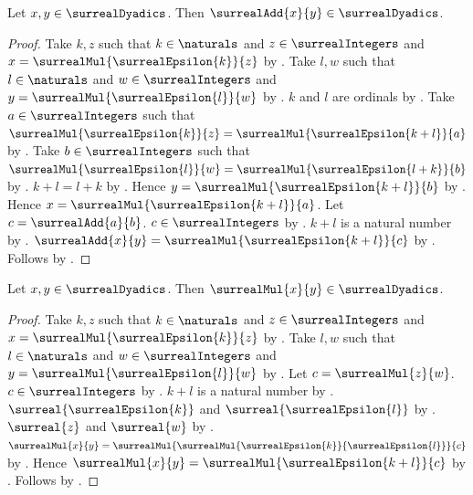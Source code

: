 \begin{theorem}\label{surreal_dyadic_addition_closed}
    Let $x,y\in\surrealDyadics$.
    Then $\surrealAdd{x}{y}\in\surrealDyadics$.
\end{theorem}
\begin{proof}
    Take $k,z$ such that $k\in\naturals$ and
        $z\in\surrealIntegers$ and
        $x=\surrealMul{\surrealEpsilon{k}}{z}$
        by .
    Take $l,w$ such that $l\in\naturals$ and
        $w\in\surrealIntegers$ and
        $y=\surrealMul{\surrealEpsilon{l}}{w}$
        by .
    $k$ and $l$ are ordinals by .
    Take $a\in\surrealIntegers$ such that
        $\surrealMul{\surrealEpsilon{k}}{z}
            =\surrealMul{\surrealEpsilon{k+l}}{a}$
        by .
    Take $b\in\surrealIntegers$ such that
        $\surrealMul{\surrealEpsilon{l}}{w}
            =\surrealMul{\surrealEpsilon{l+k}}{b}$
        by .
    $k+l=l+k$ by .
    Hence $y=\surrealMul{\surrealEpsilon{k+l}}{b}$
        by \auto.
    Hence $x=\surrealMul{\surrealEpsilon{k+l}}{a}$.
    Let $c=\surrealAdd{a}{b}$.
    $c\in\surrealIntegers$
        by .
    $k+l$ is a natural number by .
    $\surrealAdd{x}{y}=\surrealMul{\surrealEpsilon{k+l}}{c}$
        by .
    Follows by .
\end{proof}

\begin{theorem}\label{surreal_dyadic_multiplication_closed}
    Let $x,y\in\surrealDyadics$.
    Then $\surrealMul{x}{y}\in\surrealDyadics$.
\end{theorem}
\begin{proof}
    Take $k,z$ such that $k\in\naturals$ and
        $z\in\surrealIntegers$ and
        $x=\surrealMul{\surrealEpsilon{k}}{z}$
        by .
    Take $l,w$ such that $l\in\naturals$ and
        $w\in\surrealIntegers$ and
        $y=\surrealMul{\surrealEpsilon{l}}{w}$
        by .
    Let $c=\surrealMul{z}{w}$.
    $c\in\surrealIntegers$
        by .
    $k+l$ is a natural number by .
    $\surreal{\surrealEpsilon{k}}$ and
        $\surreal{\surrealEpsilon{l}}$
        by .
    $\surreal{z}$ and $\surreal{w}$
        by .
    $\surrealMul{x}{y}
        =\surrealMul
            {\surrealMul{\surrealEpsilon{k}}{\surrealEpsilon{l}}}
            {c}$
        by .
    Hence $\surrealMul{x}{y}
        =\surrealMul{\surrealEpsilon{k+l}}{c}$
        by .
    Follows by .
\end{proof}
